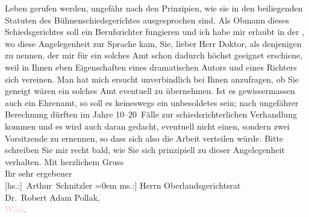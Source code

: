                     Leben gerufen werden, ungefähr nach den Prinzipien, wie sie in den beiliegenden
                    Statuten des Bühnenschiedsgerichtes ausgesprochen sind. Als Obmann dieses
                    Schiedsgerichtes soll ein Berufsrichter fungieren und ich habe mir erlaubt in
                    der \label{K_L02356_1v}\label{K_L02356_1h},
                    wo diese Angelegenheit zur Sprache kam, Sie, lieber Herr Doktor, als denjenigen
                    zu nennen, der mir für ein solches Amt schon dadurch höchst geeignet erschiene,
                    weil in Ihnen eben Eigenschaften eines dramatischen Autors und eines Richters
                    sich vereinen. Man hat mich ersucht unverbindlich bei Ihnen anzufragen, ob Sie
                    geneigt wären ein solches Amt eventuell zu übernehmen. Ist es gewissermassen
                    auch ein Ehrenamt, so soll es keineswegs ein unbesoldetes sein; nach ungefährer
                    Berechnung dürften im Jahre 10–20 Fälle zur schiedsrichterlichen Verhandlung
                    kommen und es wird auch daran gedacht, eventuell nicht einen, sondern zwei
                    Vorsitzende zu ernennen, so dass sich also die Arbeit verteilen würde. Bitte
                    schreiben Sie mir recht bald, wie Sie sich prinzipiell zu dieser Angelegenheit
                    verhalten.\pend
           \pstart
           Mit herzlichem Gruss{\\[\baselineskip]}Ihr sehr ergebener{\\[\baselineskip]}\spacefill\mbox{{[}hs.:{]} Arthur Schnitzler}\pend
           \leftskip=0em{}\pstart
           \noindent{}{[}ms.:{]} Herrn Oberlandsgerichtsrat{\\}Dr. Robert
                        Adam Pollak,{\\}\textcolor{pink}{Wien}{}\ledrightnote{\textcolor{pink}{Wien}}.\pend
           \endnumbering{}  
      